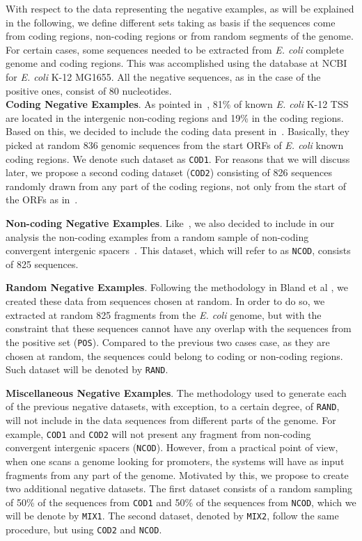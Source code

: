 \documentclass{sig-alternate}
\theoremstyle{plain}
\begin{document}
With respect to the data representing the negative examples, as will be explained in the following, we define different sets taking as basis if the sequences come from coding regions, non-coding regions or from random segments of the genome.  For certain cases,  some sequences needed to be extracted from {\it E. coli } complete genome and coding regions. This was accomplished  using  the database at  NCBI ~\cite{ncbi2012} for {\it E. coli } K-12 MG1655. All the negative sequences, as in the case of the positive ones, consist of 80 nucleotides.\\

\noindent
{\bf Coding Negative Examples}. As pointed in~\cite{gordon2003}, 81\% of known {\it E. coli} K-12 TSS are located in the intergenic non-coding regions and 19\% in the coding regions. Based on this,  we decided to include the coding data present in~\cite{gordon2003,song2011a}. Basically, they picked at random   836 genomic sequences  from the start ORFs of      {\it E. coli}  known coding regions. We denote such dataset as {\tt COD1}. For reasons that we will discuss later,  we propose a second coding dataset ({\tt COD2}) consisting of 826 sequences randomly drawn from any part of the coding regions, not only from  the start of the ORFs as in~\cite{gordon2003,song2011a}. 

\noindent
{\bf Non-coding Negative Examples}. Like~\cite{gordon2003,song2011a}, we also decided to include in our analysis the non-coding examples from a random sample of non-coding convergent intergenic spacers~\cite{palleja2009}. This dataset, which will refer to as {\tt NCOD}, consists of 825 sequences. 

\noindent
{\bf Random Negative Examples}. Following the methodology in Bland et al \cite{bland2010}, we created these data  from sequences chosen at random. In order to do so,  we extracted  at random   825  fragments from the {\it E. coli}  genome, but with the constraint that these sequences cannot have any overlap with the sequences from the positive set ({\tt POS}).  Compared to the previous two cases case, as they are chosen at random, the sequences  could belong to coding or non-coding regions. Such  dataset will be denoted by {\tt RAND}.

\noindent
{\bf Miscellaneous Negative Examples}. The methodology used to generate each of  the previous negative datasets, with exception, to a certain degree,  of {\tt RAND}, will not include in the data sequences from different parts of the genome. For example, {\tt COD1} and {\tt COD2} will not present any fragment from  non-coding convergent intergenic spacers ({\tt NCOD}). However, from a practical point of view, when one scans a genome looking for promoters, the systems will have as input fragments from any part of the genome. Motivated by this,  we propose to create two additional negative datasets. The first dataset consists of a random sampling of 50\% of the sequences from {\tt COD1} and  50\% of the sequences from  {\tt NCOD}, which we  will be denote by  {\tt MIX1}. The second dataset, denoted by {\tt MIX2},  follow the same procedure, but using  {\tt COD2} and {\tt NCOD}. 
\end{document}
